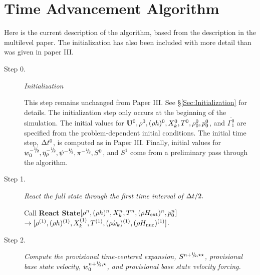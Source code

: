 
\section{Time Advancement Algorithm}\label{Sec:Time Advancement Algorithm}
Here is the current description of the algorithm, based from the description
in the multilevel paper.
The initialization has also been included with more detail than was given in paper III.

\begin{description}


\item[Step 0.] {\em Initialization}

This step remains unchanged from Paper III.  See \S \ref{Sec:Initialization}
for details.  The initialization step only occurs at the beginning of the simulation.  
The initial values for ${\bf U}^0, \rho^0, (\rho h)^0, X_k^0, T^0, 
\rho_0^0, p_0^0$, and $\overline{\Gamma_1^0}$ are specified from the problem-dependent 
initial conditions.  The initial time step, $\Delta t^0$, is computed as in 
Paper III.  Finally, initial
values for $w_0^{-\myhalf}, \etarho^{-\myhalf}, \psi^{-\myhalf}, 
\pi^{-\myhalf}, S^0$, and $S^1$ come from a preliminary pass through
the algorithm.  

\item[Step 1.] {\em React the full state through the first time interval of $\Delta t / 2.$}

Call {\bf React State}$[\rho^n, (\rho h)^n, X_k^n, T^n, (\rho{H_{\rm ext}})^n, p_0^n]$\\
\phantom{ }\hfill $\rightarrow [\rho^{(1)},(\rho h)^{(1)},X_k^{(1)},T^{(1)},(\rho \dot{\omega}_k)^{(1)},(\rho {H_{\rm nuc}})^{(1)}]$.


\item[Step 2.] {\em Compute the provisional time-centered expansion,
  $S^{\nph,\star\star}$, provisional base state velocity,
  $w_0^{\nph,\star}$, and provisional base state velocity forcing.}


\end{description}
